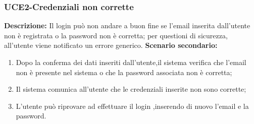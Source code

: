 \subsubsection{UCE2-Credenziali non corrette}
\textbf{Descrizione: }Il login può non andare a buon fine se l'email inserita dall'utente non è registrata
o la password non è corretta; per questioni di sicurezza, all'utente viene notificato un errore generico.
\textbf{Scenario secondario:}
\begin{enumerate}
    \item Dopo la conferma dei dati inseriti dall'utente,il sistema verifica
    che l'email non è presente nel sistema o che la password associata non è corretta;
    \item Il sistema comunica all'utente che le credenziali inserite non sono corrette;
    \item L'utente può riprovare ad effettuare il login ,inserendo di nuovo l'email e la password.
\end{enumerate}
